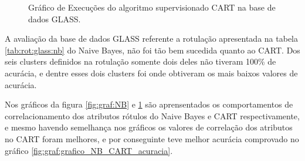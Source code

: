 \begin{figure}[!h]
{        \label{fig:graf:GLASS_CART_3} }
    \hspace{0.5cm}
    
    \caption{Gráfico de Execuções do algoritmo supervisionado CART na base de dados GLASS.} \label{fig:graf:CART}
        
\end{figure}

A avaliação da base de dados GLASS referente a rotulação apresentada na tabela \ref{tab:rot:glass:nb} do Naive Bayes, não foi tão bem sucedida quanto ao CART. Dos seis clusters definidos na rotulação somente dois deles não tiveram 100\% de acurácia, e dentre esses dois clusters foi onde obtiveram os mais baixos valores de acurácia.


Nos gráficos da figura  \ref{fig:graf:NB} e \ref{fig:graf:CART} são aprensentados os comportamentos de correlacionamento dos atributos rótulos do Naive Bayes e CART respectivamente, e mesmo havendo semelhança nos gráficos os valores de correlação dos atributos no CART foram melhores, e por conseguinte teve melhor acurácia comprovado no gráfico \ref{fig:graf:grafico_NB_CART_acuracia}.

